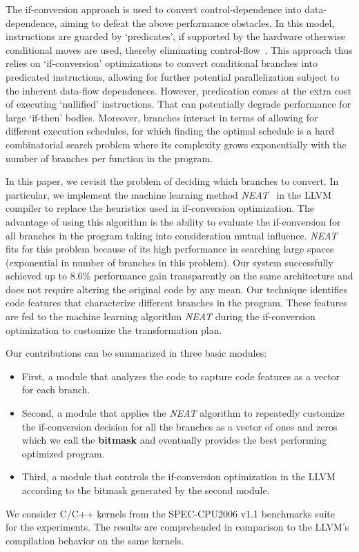 \documentclass[preprint,nocopyrightspace]{sigplanconf}
\begin{document}
The if-conversion approach is used to convert control-depen\-dence into data-depen\-dence, aiming to defeat the above performance obstacles. In this model, instructions are guarded by `predicates', if supported by the hardware otherwise conditional moves are used, thereby eliminating control-flow~\cite{mahlke1995comparison}. This approach thus relies on `if-conversion' optimizations to convert conditional branches into predicated instructions, allowing for further potential parallelization subject to the inherent data-flow dependences. However, predication comes at the extra cost of executing `nullified' instructions. That can potentially degrade performance for large `if-then' bodies. Moreover, branches interact in terms of allowing for different execution schedules, for which finding the optimal schedule is a hard combinatorial search problem where its complexity grows exponentially with the number of branches per function in the program.



In this paper, we revisit the problem of deciding which bran\-ches to convert. In particular, we implement the machine learning method \textit{NEAT}~\cite{stanley:ec02} in the LLVM compiler to replace the heuristics used in if-conversion optimization. The advantage of using this algorithm is the ability to evaluate the if-conversion for all branches in the program taking into consideration mutual influence.
\textit{NEAT} fits for this problem because of its high performance in searching large spaces (exponential in number of branches in this problem).
Our system successfully achieved up to 8.6\% performance gain transparently on the same architecture and does not require altering the original code by any mean. Our technique identifies code features that characterize different branches in the program. These features are fed to the machine learning algorithm \textit{NEAT} during the if-conversion optimization to customize the transformation plan.

Our contributions can be summarized in three basic modules: 
\begin{itemize}
\item First, a module that analyzes the code to capture code features as a vector for each branch. 
\item Second, a module that applies the \textit{NEAT} algorithm to repeatedly customize the if-conversion decision for all the branches as a vector of ones and zeros which we call the \textbf{bitmask} and eventually provides the best performing optimized program. 
\item Third, a module that controls the if-conversion optimization in the LLVM according to the bitmask generated by the second module. 
\end{itemize}
We consider C/C++ kernels from the SPEC-CPU2006 v1.1 ben\-chmarks suite~\cite{spec} for the experiments. 
The results are comprehended in comparison to the LLVM's compilation behavior on the same kernels. 
\end{document}
